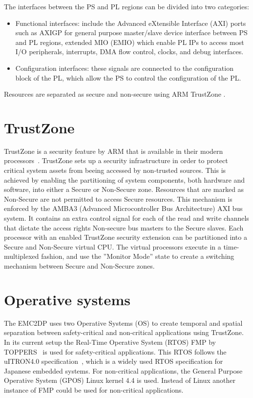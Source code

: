 The interfaces between the PS and PL regions can be divided into two categories: 
\begin{itemize}
\item Functional interfaces: include the Advanced eXtensible Interface (AXI) ports such as AXIGP for general purpose master/slave device interface between PS and PL regions, extended MIO (EMIO) which enable PL IPs to access most I/O peripherals, interrupts, DMA flow control, clocks, and debug interfaces.
\item Configuration interfaces: these signals are connected to the configuration block of the PL, which allow the PS to control the configuration of the PL. %
\end{itemize}

Resources are separated as secure and non-secure using ARM TrustZone \cite{website:ARM}.\\

\section{TrustZone}
\label{sec:trustzone}
TrustZone is a security feature by ARM that is available in their modern processors~\cite{website:ARM}. TrustZone sets up a security infrastructure in order to protect critical system assets from beeing accessed by non-trusted sources. This is achieved by enabling the partitioning of system components, both hardware and software, into either a Secure or Non-Secure zone. Resources that are marked as Non-Secure are not permitted to access Secure resources. This mechanism is enforced by the AMBA3 (Advanced Microcontroller Bus Architecture) AXI bus system. It contains an extra control signal for each of the read and write channels that dictate the access rights Non-secure bus masters to the Secure slaves. Each processor with an enabled TrustZone security extension can be partitioned into a Secure and Non-Secure virtual CPU. The virtual processors execute in a time-multiplexed fashion, and use the ”Monitor Mode” state to create a switching mechanism between Secure and Non-Secure zones.~\cite{zaki2016} \\ %

\section{Operative systems}
The EMC2DP uses two Operative Systems (OS) to create temporal and spatial separation between safety-critical and non-critical applications using TrustZone. In its current setup the Real-Time Operative System (RTOS) FMP by TOPPERS~\cite{website:FMP} is used for safety-critical applications. This RTOS follows the uITRON4.0 specification~\cite{uitron}, which is a widely used RTOS specification for Japanese embedded systems. For non-critical applications, the General Purpose Operative System (GPOS) Linux kernel 4.4 is used. Instead of Linux another instance of FMP could be used for non-critical applications.\\

